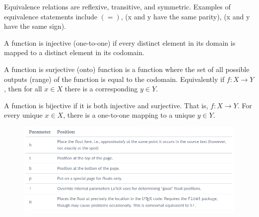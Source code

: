 \documentclass[a4paper,11pt]{article}
\begin{document}
Equivalence relations are reflexive, transitive, and symmetric. Examples of equivalence statements include $(=)$, (x and y have the same parity), (x and y have the same sign).

A function is injective (one-to-one) if every distinct element in its domain is mapped to a distinct element in its codomain.

A function is surjective (onto) function is a function where the set of all possible outputs (range) of the function is equal to the codomain. Equivalently if $f: X \rightarrow Y$, then for all $x \in X$ there is a corresponding $y \in Y$.

A function is bijective if it is both injective and surjective. That is, $f: X \rightarrow Y$. For every unique $x \in X$, there is a one-to-one mapping to a unique $y \in Y$.

\begin{figure}[b]
 \centering
 \includegraphics[width=1.0\textwidth]{figurelatex.png}
 \caption{}
\end{figure}
\end{document}
